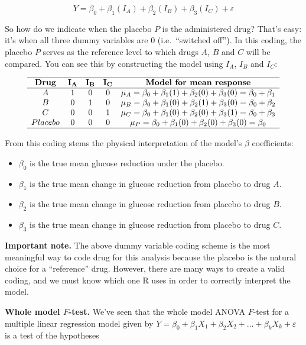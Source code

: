 \documentclass[
]{book}
\providecommand{\tightlist}{%
  \setlength{\itemsep}{0pt}\setlength{\parskip}{0pt}}
\begin{document}
\[Y = \beta_0 + \beta_1(I_A) + \beta_2(I_B) + \beta_3(I_C) + \varepsilon\]

So how do we indicate when the placebo \(P\) is the administered drug? That's easy: it's when all three dummy variables are 0 (i.e.~``switched off''). In this coding, the placebo \(P\) serves as the reference level to which drugs \(A\), \(B\) and \(C\) will be compared. You can see this by constructing the model using \(I_A\), \(I_B\) and \(I_C\):

\[\begin{array}{ccccc}
\hline
\textbf{Drug} & \mathbf{I_A} & \mathbf{I_B} & \mathbf{I_C} & \textbf{Model for mean response} \\
\hline
A & 1 & 0 & 0 & \mu_{A} =  \beta_0 + \beta_1(1) + \beta_2(0) + \beta_3(0) = \beta_0 +\beta_1\\
B & 0 & 1 & 0 & \mu_{B} = \beta_0 + \beta_1(0) + \beta_2(1) + \beta_3(0) = \beta_0 + \beta_2\\
C & 0 & 0 & 1 & \mu_{C} = \beta_0 + \beta_1(0) + \beta_2(0) + \beta_3(1) = \beta_0 + \beta_3\\
Placebo & 0 & 0 & 0 & \mu_{P} = \beta_0 + \beta_1(0) + \beta_2(0) + \beta_3(0) = \beta_0\\
\hline
\end{array}\]

From this coding stems the physical interpretation of the model's \(\beta\) coefficients:

\begin{itemize}
\tightlist
\item
  \(\beta_0\) is the true mean glucose reduction under the placebo.
\item
  \(\beta_1\) is the true mean change in glucose reduction from placebo to drug \(A\).
\item
  \(\beta_2\) is the true mean change in glucose reduction from placebo to drug \(B\).
\item
  \(\beta_3\) is the true mean change in glucose reduction from placebo to drug \(C\).
\end{itemize}

\textbf{Important note.} The above dummy variable coding scheme is the most meaningful way to code drug for this analysis because the placebo is the natural choice for a ``reference'' drug. However, there are many ways to create a valid coding, and we must know which one R uses in order to correctly interpret the model.

\textbf{Whole model \(F\)-test.} We've seen that the whole model ANOVA \(F\)-test for a multiple linear regression model given by \(Y = \beta_0 + \beta_1 X_1 + \beta_2 X_2 + \ldots + \beta_k X_k + \varepsilon\) is a test of the hypotheses
\end{document}
